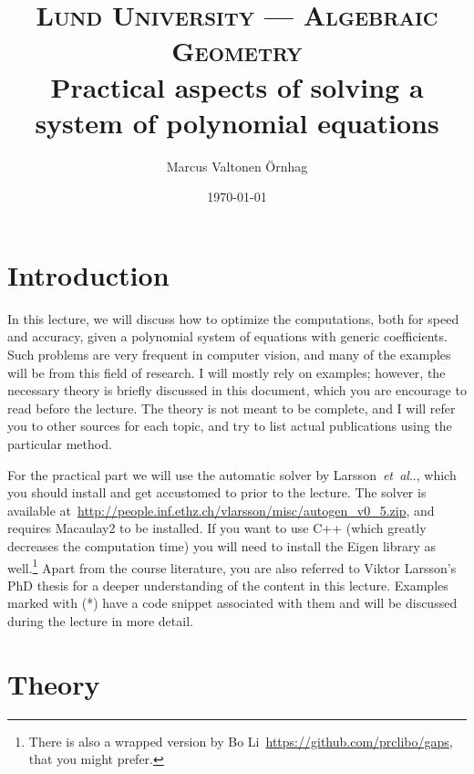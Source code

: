 \documentclass[11pt,a4paper]{article}
\title{
\normalfont \normalsize
\textsc{Lund University --- Algebraic Geometry} \\ [7pt]
\Large Practical aspects of solving a system of polynomial equations \\
}
\author{Marcus Valtonen \"{O}rnhag} %
\date{\normalsize\today} %
\makeatletter
\theoremstyle{definition}
\DeclareRobustCommand\etal{\emph{et~al}\@ifnextchar.{}{.\@}}
\makeatother
\begin{document}
\maketitle %

\section{Introduction}
In this lecture, we will discuss how to optimize the computations, both for speed and
accuracy, given a polynomial system of equations with generic coefficients. Such problems are very
frequent in computer vision, and many of the examples will be from this field of research.
I will mostly rely on examples; however,
the necessary theory is briefly discussed in this document, which you are encourage to read before
the lecture. The theory is not meant to be complete, and I will refer you to other sources for
each topic, and try to list actual publications using the particular method.

For the practical part we will use the
automatic solver by Larsson~\etal{}, which you should install and get accustomed to prior
to the lecture. The solver is available at~\url{http://people.inf.ethz.ch/vlarsson/misc/autogen_v0_5.zip}, and requires Macaulay2 to be installed. If you want to use C++ (which greatly decreases the computation time) you will need to install the Eigen library as well.\footnote{There is also a wrapped version by Bo Li~\url{https://github.com/prclibo/gaps}, that you might prefer.}
Apart from the course literature, you are also referred to Viktor Larsson's PhD
thesis for a deeper understanding of the content in this lecture.
Examples marked with (*) have a code snippet associated with them and will be discussed during the
lecture in more detail.

\section{Theory}
\end{document}
